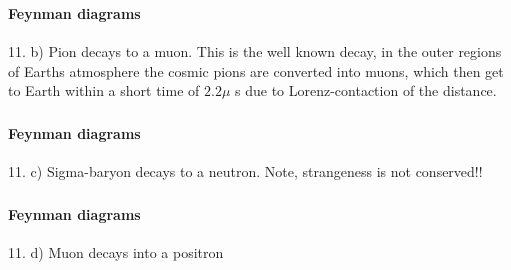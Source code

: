 \begin{frame}
\frametitle{\texorpdfstring{\culine[\sectiontitleulinecolor]{\sectiontitle}}{\sectiontitle} }
%
\framesubtitle{Feynman diagrams}

11. b) Pion decays to a muon. This is the well known decay, in the outer regions of Earths atmosphere the cosmic pions are converted into muons, which then get to Earth within a short time of $2.2 \mu$ s due to Lorenz-contaction of the distance.


\endofslide 
\end{frame}


\begin{frame}
\frametitle{\texorpdfstring{\culine[\sectiontitleulinecolor]{\sectiontitle}}{\sectiontitle} }
%
\framesubtitle{Feynman diagrams}

11. c) Sigma-baryon decays to a neutron.
Note, strangeness is not conserved!!


\endofslide 
\end{frame}


\begin{frame}
\frametitle{\texorpdfstring{\culine[\sectiontitleulinecolor]{\sectiontitle}}{\sectiontitle} }
%
\framesubtitle{Feynman diagrams}

11. d) Muon decays into a positron


\endofslide 
\end{frame}


